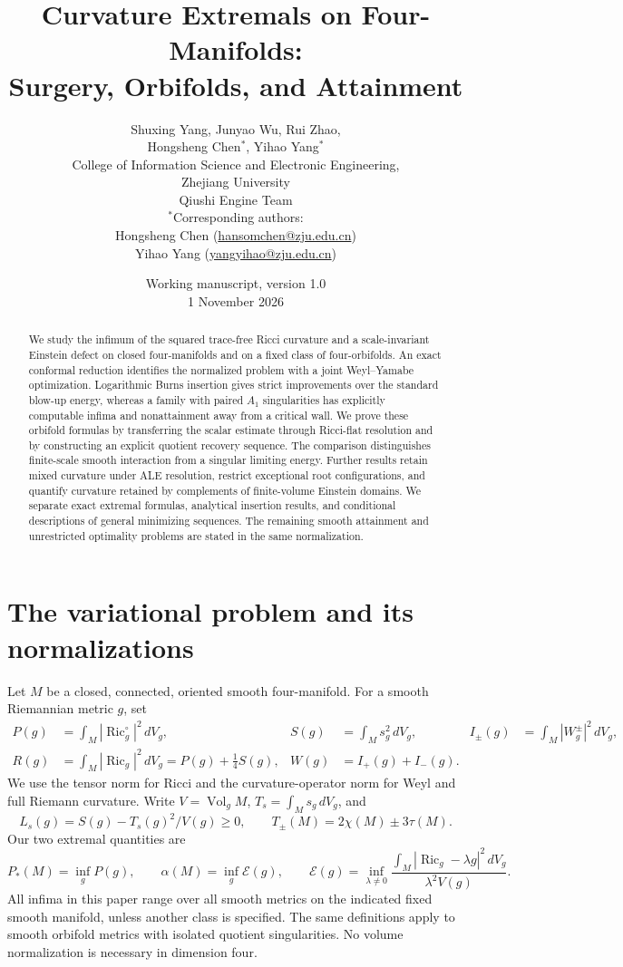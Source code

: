 \documentclass[11pt,a4paper]{article}
\title{Curvature Extremals on Four-Manifolds:\\Surgery, Orbifolds, and Attainment}
\author{\normalsize Shuxing Yang, Junyao Wu, Rui Zhao,\\[3pt]
\normalsize Hongsheng Chen$^{*}$, Yihao Yang$^{*}$\\[9pt]
\small College of Information Science and Electronic Engineering,\\
\small Zhejiang University\\
\small Qiushi Engine Team\\[8pt]
\footnotesize $^{*}$Corresponding authors:\\
\footnotesize Hongsheng Chen (\href{mailto:hansomchen@zju.edu.cn}{hansomchen@zju.edu.cn})\\
\footnotesize Yihao Yang (\href{mailto:yangyihao@zju.edu.cn}{yangyihao@zju.edu.cn})}
\date{\small Working manuscript, version 1.0\\1 November 2026}
\theoremstyle{definition}\newtheorem{definition}[theorem]{Definition}
\theoremstyle{remark}\newtheorem{remark}[theorem]{Remark}
\newcommand{\Ric}{\operatorname{Ric}}
\newcommand{\Vol}{\operatorname{Vol}}
\newcommand{\E}{\mathcal E}
\newcommand{\dd}{\,dV}
\begin{document}
\maketitle
\begin{abstract}
We study the infimum of the squared trace-free Ricci curvature and a scale-invariant Einstein defect on closed four-manifolds and on a fixed class of four-orbifolds. An exact conformal reduction identifies the normalized problem with a joint Weyl--Yamabe optimization. Logarithmic Burns insertion gives strict improvements over the standard blow-up energy, whereas a family with paired $A_1$ singularities has explicitly computable infima and nonattainment away from a critical wall. We prove these orbifold formulas by transferring the scalar estimate through Ricci-flat resolution and by constructing an explicit quotient recovery sequence. The comparison distinguishes finite-scale smooth interaction from a singular limiting energy. Further results retain mixed curvature under ALE resolution, restrict exceptional root configurations, and quantify curvature retained by complements of finite-volume Einstein domains. We separate exact extremal formulas, analytical insertion results, and conditional descriptions of general minimizing sequences. The remaining smooth attainment and unrestricted optimality problems are stated in the same normalization.
\end{abstract}
\tableofcontents

\section{The variational problem and its normalizations}
Let $M$ be a closed, connected, oriented smooth four-manifold. For a smooth Riemannian metric $g$, set
\begin{align*}
 P(g)&=\int_M|\Ric_g^\circ|^2\dd_g,& S(g)&=\int_Ms_g^2\dd_g,&
 I_\pm(g)&=\int_M|W_g^\pm|^2\dd_g,\\
 R(g)&=\int_M|\Ric_g|^2\dd_g=P(g)+\tfrac14S(g),&
 W(g)&=I_+(g)+I_-(g).
\end{align*}
We use the tensor norm for Ricci and the curvature-operator norm for Weyl and full Riemann curvature. Write $V=\Vol_gM$, $T_s=\int_Ms_g\dd_g$, and
\[
 L_s(g)=S(g)-T_s(g)^2/V(g)\ge0,\qquad T_\pm(M)=2\chi(M)\pm3\tau(M).
\]
Our two extremal quantities are
\begin{equation}\label{eq:definitions}
 P_*(M)=\inf_g P(g),\qquad
 \alpha(M)=\inf_g\E(g),\qquad
 \E(g)=\inf_{\lambda\ne0}\frac{\int_M|\Ric_g-\lambda g|^2\dd_g}{\lambda^2V(g)}.
\end{equation}
All infima in this paper range over all smooth metrics on the indicated fixed smooth manifold, unless another class is specified. The same definitions apply to smooth orbifold metrics with isolated quotient singularities. No volume normalization is necessary in dimension four.
\end{document}
